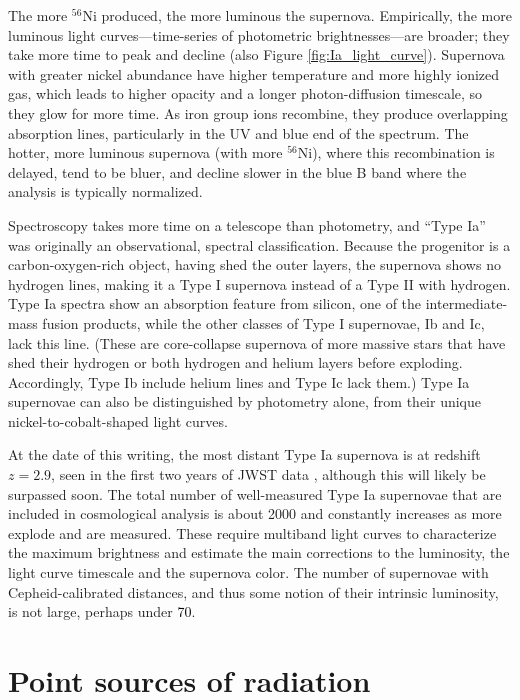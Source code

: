 The more $^{56}$Ni produced, the more luminous the supernova.  Empirically, the more luminous light curves---time-series of photometric brightnesses---are broader; they take more time to peak and decline (also Figure \ref{fig:Ia_light_curve}).  Supernova with greater nickel abundance have higher temperature and more highly ionized gas, which leads to higher opacity and a longer photon-diffusion timescale, so they glow for more time.  As iron group ions recombine, they produce overlapping absorption lines, particularly in the UV and blue end of the spectrum.  The hotter, more luminous supernova (with more $^{56}$Ni), where this recombination is delayed, tend to be bluer, and decline slower in the blue B band where the analysis is typically normalized.

Spectroscopy takes more time on a telescope than photometry, and ``Type Ia'' was originally an observational, spectral classification.  Because the progenitor is a carbon-oxygen-rich object, having shed the outer layers, the supernova shows no hydrogen lines, making it a Type I supernova instead of a Type II with hydrogen.  Type Ia spectra show an absorption feature from silicon, one of the intermediate-mass fusion products, while the other classes of Type I supernovae, Ib and Ic, lack this line.   (These are core-collapse supernova of more massive stars that have shed their hydrogen or both hydrogen and helium layers before exploding.  Accordingly, Type Ib include helium lines and Type Ic lack them.)  Type Ia  supernovae can also be distinguished by photometry alone, from their unique nickel-to-cobalt-shaped light curves.


At the date of this writing, the most distant Type Ia supernova is at redshift $z=2.9$, seen in the first two years of JWST data \citep[SN 2023adsy,][]{2025A&A...701A..70V}, although this will likely be surpassed soon.  The total number of well-measured Type Ia supernovae that are included in cosmological analysis is about {2000} and constantly increases as more explode and are measured.  These require multiband light curves to characterize the maximum brightness and estimate the main corrections to the luminosity, the light curve timescale and the supernova color.  The number of supernovae with Cepheid-calibrated distances, and thus some notion of their intrinsic luminosity, is not large, perhaps under \textcolor{black}{70}.


  
\section{Point sources of radiation}

